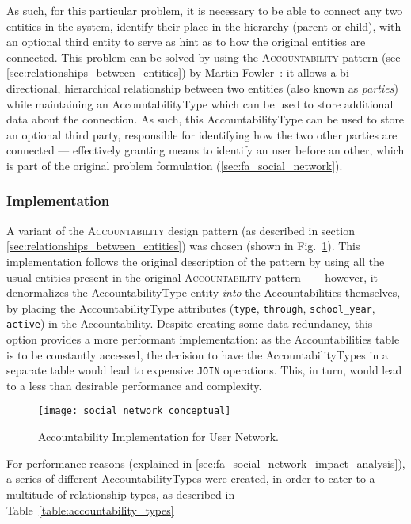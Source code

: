 As such, for this particular problem, it is necessary to be able to connect any two entities in the system, identify their place in the hierarchy (parent or child), with an optional third entity to serve as hint as to how the original entities are connected. This problem can be solved by using the \textsc{Accountability} pattern (see \ref{sec:relationships_between_entities}) by Martin Fowler~\cite{fowler_accountability}: it allows a bi-directional, hierarchical relationship between two entities (also known as \emph{parties}) while maintaining an AccountabilityType which can be used to store additional data about the connection. As such, this AccountabilityType can be used to store an optional third party, responsible for identifying how the two other parties are connected --- effectively granting means to identify an user before an other, which is part of the original problem formulation (\ref{sec:fa_social_network}).

\subsubsection{Implementation}\label{sec:fa_social_network_implementation}

A variant of the \textsc{Accountability} design pattern (as described in section \ref{sec:relationships_between_entities}) was chosen (shown in Fig.~\ref{fig:social_network_conceptual}). This implementation follows the original description of the pattern by using all the usual entities present in the original \textsc{Accountability} pattern~\cite{fowler_accountability} --- however, it denormalizes the AccountabilityType entity \emph{into} the Accountabilities themselves, by placing the AccountabilityType attributes (\verb!type!, \verb!through!, \verb!school_year!, \verb!active!) in the Accountability. Despite creating some data redundancy, this option provides a more performant implementation: as the Accountabilities table is to be constantly accessed, the decision to have the AccountabilityTypes in a separate table would lead to expensive \verb!JOIN! operations. This, in turn, would lead to a less than desirable performance and complexity.

\begin{figure}[H]
  \centering
  \texttt{[image: social\_network\_conceptual]}
  \caption{Accountability Implementation for User Network.}
  \label{fig:social_network_conceptual}
\end{figure}

For performance reasons (explained in \ref{sec:fa_social_network_impact_analysis}), a series of different AccountabilityTypes were created, in order to cater to a multitude of relationship types, as described in Table~\ref{table:accountability_types}

